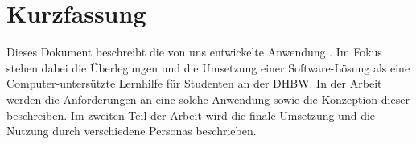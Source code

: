 \chapter*{Kurzfassung}

Dieses Dokument beschreibt die von uns entwickelte Anwendung \NameDerAnwendung.
Im Fokus stehen dabei die Überlegungen und die Umsetzung einer Software-Lösung als eine Computer-untersützte Lernhilfe für Studenten an der DHBW. %
In der Arbeit werden die Anforderungen an eine solche Anwendung sowie die Konzeption dieser beschreiben.
Im zweiten Teil der Arbeit wird die finale Umsetzung und die Nutzung durch verschiedene Personas beschrieben.


